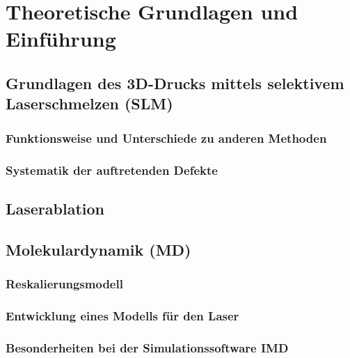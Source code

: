 \chapter{Theoretische Grundlagen und Einführung}



\section{Grundlagen des 3D-Drucks mittels selektivem Laserschmelzen (SLM)}
    \subsection{Funktionsweise und Unterschiede zu anderen Methoden}
    \subsection{Systematik der auftretenden Defekte}


\section{Laserablation}


\section{Molekulardynamik (MD)}
    \subsection{Reskalierungsmodell}
    \subsection{Entwicklung eines Modells für den Laser}
    \subsection{Besonderheiten bei der Simulationssoftware IMD}